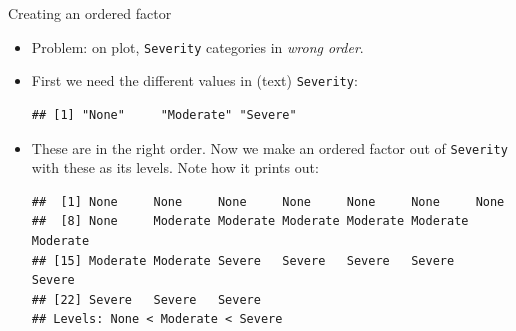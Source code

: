 \begin{frame}[fragile]{Creating an ordered factor}
  
  \begin{itemize}
  \item Problem: on plot, \texttt{Severity} categories in \emph{wrong
      order}. 
  \item First we need the different values in  (text) \texttt{Severity}:
    
\begin{knitrout}
\color{fgcolor}\begin{kframe}
\begin{alltt}
\hlkwb{=}\hlopt{$}
\end{alltt}
\begin{verbatim}
## [1] "None"     "Moderate" "Severe"
\end{verbatim}
\end{kframe}
\end{knitrout}

\item These are in the right order. Now we make an ordered factor out
  of \texttt{Severity} with these as its levels. Note how it prints out:
  
  {\small
\begin{knitrout}
\color{fgcolor}\begin{kframe}
\begin{alltt}
\hlkwb{=}\hlopt{$}
\end{alltt}
\begin{verbatim}
##  [1] None     None     None     None     None     None     None    
##  [8] None     Moderate Moderate Moderate Moderate Moderate Moderate
## [15] Moderate Moderate Severe   Severe   Severe   Severe   Severe  
## [22] Severe   Severe   Severe  
## Levels: None < Moderate < Severe
\end{verbatim}
\end{kframe}
\end{knitrout}
}
  \end{itemize}
  
\end{frame}

